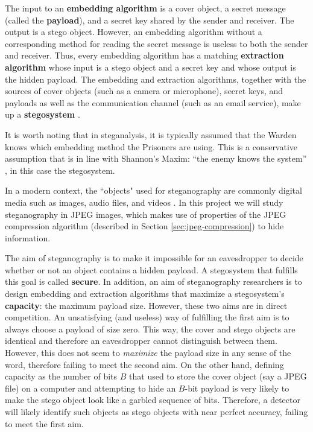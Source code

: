 \documentclass[11pt,a4paper,twoside,openright]{report}
\begin{document}
The input to an \textbf{embedding algorithm} is a cover object, a secret message (called the \textbf{payload}), and a secret key shared by the sender and receiver. The output is a stego object. However, an embedding algorithm without a corresponding method for reading the secret message is useless to both the sender and receiver. Thus, every embedding algorithm has a matching \textbf{extraction algorithm} whose input is a stego object and a secret key and whose output is the hidden payload. The embedding and extraction algorithms, together with the sources of cover objects (such as a camera or microphone), secret keys, and payloads as well as the communication channel (such as an email service), make up a \textbf{stegosystem} \cite{ker-notes}.

It is worth noting that in steganalysis, it is typically assumed that the Warden knows which embedding method the Prisoners are using. This is a conservative assumption that is in line with Shannon's Maxim: ``the enemy knows the system'' \cite{shannon}, in this case the stegosystem.

In a modern context, the ``objects" used for steganography are commonly digital media such as images, audio files, and videos \cite{laboratory-to-real-world}. In this project we will study steganography in JPEG images, which makes use of properties of the JPEG compression algorithm (described in Section \ref{sec:jpeg-compression}) to hide information.

The aim of steganography is to make it impossible for an eavesdropper to decide whether or not an object contains a hidden payload. A stegosystem that fulfills this goal is called \textbf{secure}. In addition, an aim of steganography researchers is to design embedding and extraction algorithms that maximize a stegosystem's \textbf{capacity}: the maximum payload size. However, these two aims are in direct competition. An unsatisfying (and useless) way of fulfilling the first aim is to always choose a payload of size zero. This way, the cover and stego objects are identical and therefore an eavesdropper cannot distinguish between them. However, this does not seem to \textit{maximize} the payload size in any sense of the word, therefore failing to meet the second aim. On the other hand, defining capacity as the number of bits $B$ that used to store the cover object (say a JPEG file) on a computer and attempting to hide an $B$-bit payload is very likely to make the stego object look like a garbled sequence of bits. Therefore, a detector will likely identify such objects as stego objects with near perfect accuracy, failing to meet the first aim.
\end{document}
